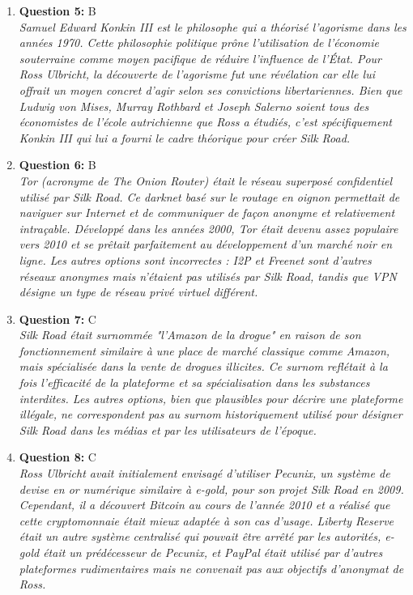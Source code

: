\documentclass[12pt,a4paper]{article}
\begin{document}
\begin{enumerate}
\item \textbf{Question 5:} B
\\ \textit{Samuel Edward Konkin III est le philosophe qui a théorisé l'agorisme dans les années 1970. Cette philosophie politique prône l'utilisation de l'économie souterraine comme moyen pacifique de réduire l'influence de l'État. Pour Ross Ulbricht, la découverte de l'agorisme fut une révélation car elle lui offrait un moyen concret d'agir selon ses convictions libertariennes. Bien que Ludwig von Mises, Murray Rothbard et Joseph Salerno soient tous des économistes de l'école autrichienne que Ross a étudiés, c'est spécifiquement Konkin III qui lui a fourni le cadre théorique pour créer Silk Road.}

\item \textbf{Question 6:} B
\\ \textit{Tor (acronyme de The Onion Router) était le réseau superposé confidentiel utilisé par Silk Road. Ce darknet basé sur le routage en oignon permettait de naviguer sur Internet et de communiquer de façon anonyme et relativement intraçable. Développé dans les années 2000, Tor était devenu assez populaire vers 2010 et se prêtait parfaitement au développement d'un marché noir en ligne. Les autres options sont incorrectes : I2P et Freenet sont d'autres réseaux anonymes mais n'étaient pas utilisés par Silk Road, tandis que VPN désigne un type de réseau privé virtuel différent.}

\item \textbf{Question 7:} C
\\ \textit{Silk Road était surnommée "l'Amazon de la drogue" en raison de son fonctionnement similaire à une place de marché classique comme Amazon, mais spécialisée dans la vente de drogues illicites. Ce surnom reflétait à la fois l'efficacité de la plateforme et sa spécialisation dans les substances interdites. Les autres options, bien que plausibles pour décrire une plateforme illégale, ne correspondent pas au surnom historiquement utilisé pour désigner Silk Road dans les médias et par les utilisateurs de l'époque.}

\item \textbf{Question 8:} C
\\ \textit{Ross Ulbricht avait initialement envisagé d'utiliser Pecunix, un système de devise en or numérique similaire à e-gold, pour son projet Silk Road en 2009. Cependant, il a découvert Bitcoin au cours de l'année 2010 et a réalisé que cette cryptomonnaie était mieux adaptée à son cas d'usage. Liberty Reserve était un autre système centralisé qui pouvait être arrêté par les autorités, e-gold était un prédécesseur de Pecunix, et PayPal était utilisé par d'autres plateformes rudimentaires mais ne convenait pas aux objectifs d'anonymat de Ross.}


\end{enumerate}
\end{document}
